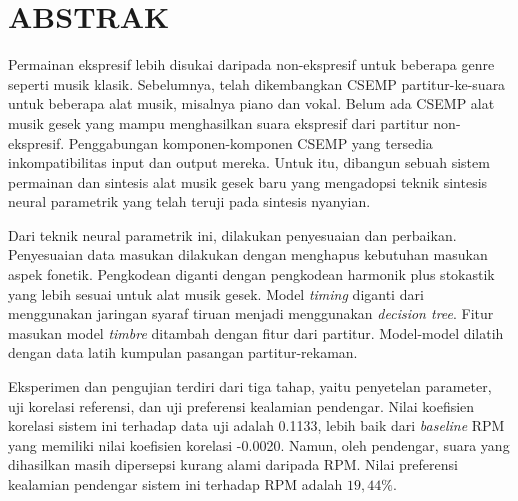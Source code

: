 \clearpage
\chapter*{ABSTRAK}

Permainan ekspresif lebih disukai daripada non-ekspresif untuk beberapa genre seperti musik klasik. Sebelumnya, telah dikembangkan CSEMP partitur-ke-suara untuk beberapa alat musik, misalnya piano dan vokal. Belum ada CSEMP alat musik gesek yang mampu menghasilkan suara ekspresif dari partitur non-ekspresif. Penggabungan komponen-komponen CSEMP yang tersedia inkompatibilitas input dan output mereka. Untuk itu, dibangun sebuah sistem permainan dan sintesis alat musik gesek baru yang mengadopsi teknik sintesis neural parametrik yang telah teruji pada sintesis nyanyian.

Dari teknik neural parametrik ini, dilakukan penyesuaian dan perbaikan. Penyesuaian data masukan dilakukan dengan menghapus kebutuhan masukan aspek fonetik. Pengkodean diganti dengan pengkodean harmonik plus stokastik yang lebih sesuai untuk alat musik gesek. Model \textit{timing} diganti dari menggunakan jaringan syaraf tiruan menjadi menggunakan \textit{decision tree}. Fitur masukan model \textit{timbre} ditambah dengan fitur dari partitur. Model-model dilatih dengan data latih kumpulan pasangan partitur-rekaman.

Eksperimen dan pengujian terdiri dari tiga tahap, yaitu penyetelan parameter, uji korelasi referensi, dan uji preferensi kealamian pendengar. Nilai koefisien korelasi sistem ini terhadap data uji adalah 0.1133, lebih baik dari \textit{baseline} RPM yang memiliki nilai koefisien korelasi -0.0020. Namun, oleh pendengar, suara yang dihasilkan masih dipersepsi kurang alami daripada RPM. Nilai preferensi kealamian pendengar sistem ini terhadap RPM adalah $19,44\%$.

\clearpage